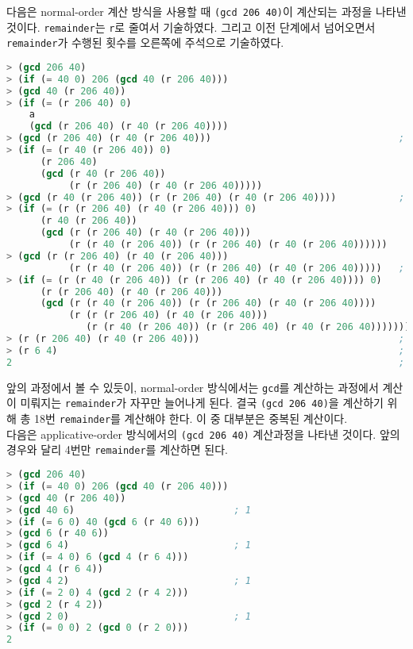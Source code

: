 
다음은 normal-order 계산 방식을 사용할 때 \texttt{(gcd 206 40)}이 계산되는
과정을 나타낸 것이다. \texttt{remainder}는 \texttt{r}로 줄여서
기술하였다. 그리고 이전 단계에서 넘어오면서 \texttt{remainder}가 수행된 횟수를
오른쪽에 주석으로 기술하였다.

\begin{lstlisting}[language=Scheme]
> (gcd 206 40)
> (if (= 40 0) 206 (gcd 40 (r 206 40)))
> (gcd 40 (r 206 40))
> (if (= (r 206 40) 0)
    a
    (gcd (r 206 40) (r 40 (r 206 40))))
> (gcd (r 206 40) (r 40 (r 206 40)))                                 ; 1
> (if (= (r 40 (r 206 40)) 0)
      (r 206 40)
      (gcd (r 40 (r 206 40))
           (r (r 206 40) (r 40 (r 206 40)))))
> (gcd (r 40 (r 206 40)) (r (r 206 40) (r 40 (r 206 40))))           ; 2
> (if (= (r (r 206 40) (r 40 (r 206 40))) 0)
      (r 40 (r 206 40))
      (gcd (r (r 206 40) (r 40 (r 206 40)))
           (r (r 40 (r 206 40)) (r (r 206 40) (r 40 (r 206 40))))))
> (gcd (r (r 206 40) (r 40 (r 206 40)))
           (r (r 40 (r 206 40)) (r (r 206 40) (r 40 (r 206 40)))))   ; 4
> (if (= (r (r 40 (r 206 40)) (r (r 206 40) (r 40 (r 206 40)))) 0)
      (r (r 206 40) (r 40 (r 206 40)))
      (gcd (r (r 40 (r 206 40)) (r (r 206 40) (r 40 (r 206 40))))
           (r (r (r 206 40) (r 40 (r 206 40)))
              (r (r 40 (r 206 40)) (r (r 206 40) (r 40 (r 206 40)))))))
> (r (r 206 40) (r 40 (r 206 40)))                                   ; 7
> (r 6 4)                                                            ; 3
2                                                                    ; 1
\end{lstlisting}

앞의 과정에서 볼 수 있듯이, normal-order 방식에서는 \texttt{gcd}를 계산하는
과정에서 계산이 미뤄지는 \texttt{remainder}가 자꾸만 늘어나게 된다. 결국
\texttt{(gcd 206 40)}을 계산하기 위해 총 18번 \texttt{remainder}를 계산해야
한다. 이 중 대부분은 중복된 계산이다. \\

다음은 applicative-order 방식에서의 \texttt{(gcd 206 40)}
계산과정을 나타낸 것이다. 앞의 경우와 달리 4번만 \texttt{remainder}를
계산하면 된다.

\begin{lstlisting}[language=Scheme]
> (gcd 206 40)
> (if (= 40 0) 206 (gcd 40 (r 206 40)))
> (gcd 40 (r 206 40))
> (gcd 40 6)                            ; 1
> (if (= 6 0) 40 (gcd 6 (r 40 6)))
> (gcd 6 (r 40 6))
> (gcd 6 4)                             ; 1
> (if (= 4 0) 6 (gcd 4 (r 6 4)))
> (gcd 4 (r 6 4))
> (gcd 4 2)                             ; 1
> (if (= 2 0) 4 (gcd 2 (r 4 2)))
> (gcd 2 (r 4 2))
> (gcd 2 0)                             ; 1
> (if (= 0 0) 2 (gcd 0 (r 2 0))) 
2
\end{lstlisting}

